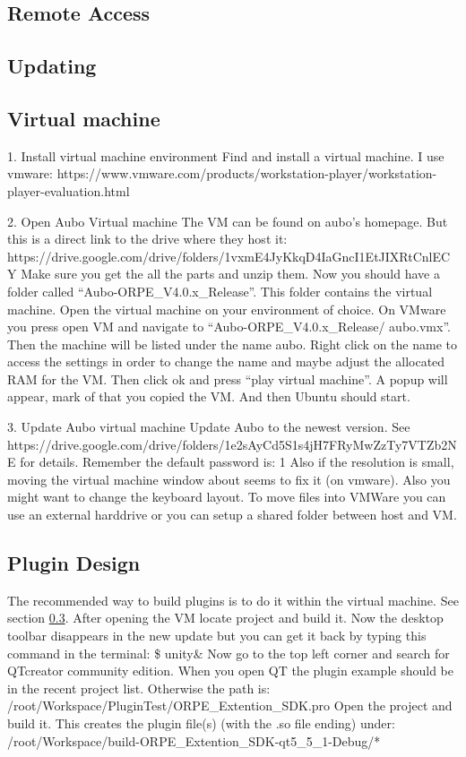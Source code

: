 \documentclass{article}
\begin{document}
\subsection{Remote Access}
\subsection{Updating}
\subsection{Virtual machine}
\label{sec:virtual}

1.	Install virtual machine environment
Find and install a virtual machine. I use vmware: https://www.vmware.com/products/workstation-player/workstation-player-evaluation.html

2.	Open Aubo Virtual machine
The VM can be found on aubo’s homepage. But this is a direct link to the drive where they host it:  https://drive.google.com/drive/folders/1vxmE4JyKkqD4IaGncI1EtJIXRtCnlECY 
Make sure you get the all the parts and unzip them. Now you should have a folder called “Aubo-ORPE_V4.0.x_Release”. This folder contains the virtual machine. 
Open the virtual machine on your environment of choice. 
On VMware you press open VM and navigate to “Aubo-ORPE_V4.0.x_Release/ aubo.vmx”. Then the machine will be listed under the name aubo. Right click on the name to access the settings in order to change the name and maybe adjust the allocated RAM for the VM. Then click ok and press “play virtual machine”.  A popup will appear, mark of that you copied the VM. And then Ubuntu should start. 

3.	Update Aubo virtual machine
Update Aubo to the newest version. See https://drive.google.com/drive/folders/1e2sAyCd5S1s4jH7FRyMwZzTy7VTZb2NE for details. 
Remember the default password is: 1 
Also if the resolution is small, moving the virtual machine window about seems to fix it (on vmware). 
Also you might want to change the keyboard layout. 
To move files into VMWare you can use an external harddrive or you can setup a shared folder between host and VM.

\subsection{Plugin Design}

The recommended way to build plugins is to do it within the virtual machine. See section \ref{sec:virtual}. 
After opening the VM locate project and build it.
Now the desktop toolbar disappears in the new update but you can get it back by typing this command in the terminal: 
\$ unity\& 
Now go to the top left corner and search for QTcreator community edition. 
When you open QT the plugin example should be in the recent project list. Otherwise the path is: /root/Workspace/PluginTest/ORPE_Extention_SDK.pro
Open the project and build it. 
This creates the plugin file(s) (with  the .so file ending) under: /root/Workspace/build-ORPE_Extention_SDK-qt5_5_1-Debug/*
\end{document}
